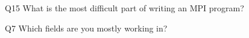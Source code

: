 \begin{description}%
\item{Q15} What is the most difficult part of writing an MPI program?%
\item{Q7} Which fields are you mostly working in?%
\end{description}%
